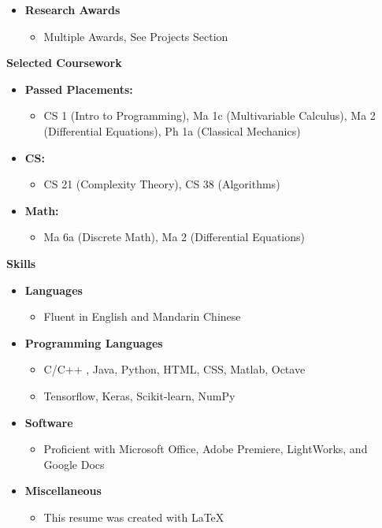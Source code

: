 \documentclass[letterpaper,11pt]{article}
\newcommand{\resheading}[1]{{\large \colorbox{mygrey}{\begin{minipage}{\textwidth}{\textbf{#1 \vphantom{p\^{E}}}}\end{minipage}}}}
\newcommand{\myitem}[1]{\item #1 \vspace{-9pt}}
\newcommand{\mysubitem}[1]{\item #1 \vspace{-4pt}}
\begin{document}
\begin{itemize}
		\myitem {\textbf{Research Awards}}
			\begin{itemize}
				\mysubitem {Multiple Awards, See Projects Section}
			\end{itemize} \vspace{-3pt}
			
	\end{itemize}

\resheading{Selected Coursework}
	\begin{itemize}
		\myitem{\textbf{Passed Placements:}}
			\begin{itemize}
				\mysubitem{CS 1 (Intro to Programming), Ma 1c (Multivariable Calculus), Ma 2 (Differential Equations), Ph 1a (Classical Mechanics)}
			\end{itemize}
		\myitem{\textbf{CS:}}
			\begin{itemize}
				\mysubitem {CS 21 (Complexity Theory), CS 38 (Algorithms)}
			\end{itemize}
		\myitem{\textbf{Math:}}
			\begin{itemize}
				\mysubitem {Ma 6a (Discrete Math), Ma 2 (Differential Equations)}
			\end{itemize}
	\end{itemize}
\resheading{Skills}
	\begin{itemize}
		\myitem {\textbf{Languages}}
			\begin{itemize}
				\mysubitem {Fluent in English and Mandarin Chinese}
			\end{itemize} \vspace{-9pt}
		\myitem {\textbf{Programming Languages}}
			\begin{itemize}
				\mysubitem {C/C++ , Java, Python, HTML, CSS, Matlab, Octave}
				\mysubitem {Tensorflow, Keras, Scikit-learn, NumPy}
			\end{itemize} \vspace{-9pt}
		\myitem {\textbf{Software}}
			\begin{itemize}
				\mysubitem {Proficient with Microsoft Office, Adobe Premiere, LightWorks, and Google Docs}
			\end{itemize} \vspace{-9pt}
		\myitem {\textbf{Miscellaneous}}
			\begin{itemize}
				\mysubitem {This resume was created with \LaTeX}
			\end{itemize} \vspace{-9pt}
	\end{itemize}
\end{document}
